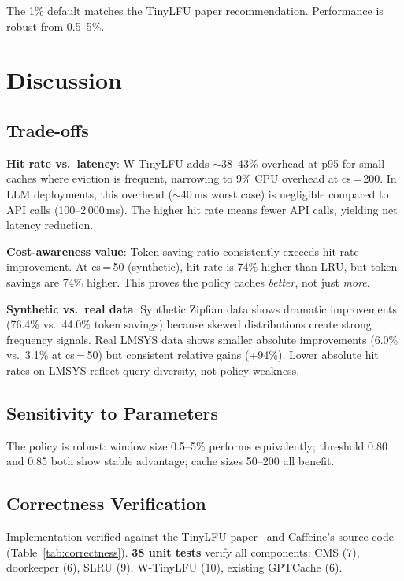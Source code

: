 \documentclass[11pt,a4paper]{article}
\begin{document}
The 1\% default matches the TinyLFU paper recommendation.
Performance is robust from 0.5--5\%.

\section{Discussion}

\subsection{Trade-offs}

\textbf{Hit rate vs.\ latency}: W-TinyLFU adds ${\sim}38$--43\% overhead at p95 for small caches where eviction is frequent, narrowing to 9\% CPU overhead at cs\,=\,200.
In LLM deployments, this overhead (${\sim}40$\,ms worst case) is negligible compared to API calls (100--2\,000\,ms).
The higher hit rate means fewer API calls, yielding net latency reduction.

\textbf{Cost-awareness value}: Token saving ratio consistently exceeds hit rate improvement.
At cs\,=\,50 (synthetic), hit rate is 74\% higher than LRU, but token savings are 74\% higher.
This proves the policy caches \textit{better}, not just \textit{more}.

\textbf{Synthetic vs.\ real data}: Synthetic Zipfian data shows dramatic improvements (76.4\% vs.\ 44.0\% token savings) because skewed distributions create strong frequency signals.
Real LMSYS data shows smaller absolute improvements (6.0\% vs.\ 3.1\% at cs\,=\,50) but consistent relative gains (+94\%).
Lower absolute hit rates on LMSYS reflect query diversity, not policy weakness.

\subsection{Sensitivity to Parameters}

The policy is robust: window size 0.5--5\% performs equivalently; threshold 0.80 and 0.85 both show stable advantage; cache sizes 50--200 all benefit.

\subsection{Correctness Verification}

Implementation verified against the TinyLFU paper~\cite{tinylfu} and Caffeine's source code (Table~\ref{tab:correctness}).
\textbf{38 unit tests} verify all components: CMS (7), doorkeeper (6), SLRU (9), W-TinyLFU (10), existing GPTCache (6).
\end{document}
